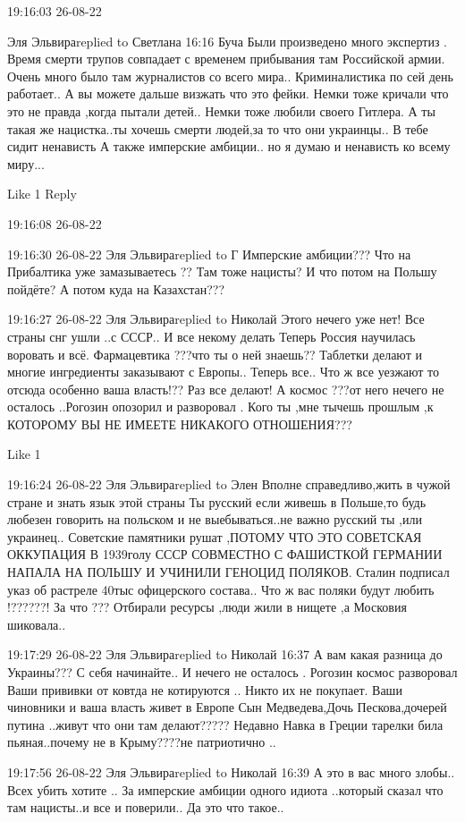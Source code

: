 
 
 
 
 

19:16:03 26-08-22

Эля Эльвираreplied to Светлана
16:16
Буча
Были произведено много экспертиз .
Время смерти трупов совпадает с временем прибывания там Российской армии.
Очень много было там журналистов со всего мира..
Криминалистика по сей день работает..
А вы можете дальше визжать что это фейки.
Немки тоже кричали что это не правда ,когда пытали детей..
Немки тоже любили своего Гитлера.
А ты такая же нацистка..ты хочешь смерти людей,за то что они украинцы..
В тебе сидит ненависть
А также имперские амбиции.. но я думаю и ненависть ко всему миру...

    Like 1
    Reply

19:16:08 26-08-22

19:16:30 26-08-22
Эля Эльвираreplied to Г
Имперские амбиции???
Что на Прибалтика уже замазываетесь ??
Там тоже нацисты?
И что потом на Польшу пойдёте?
А потом куда на Казахстан???

19:16:27 26-08-22
Эля Эльвираreplied to Николай
Этого нечего уже нет!
Все страны снг ушли ..с СССР..
И все некому делать
Теперь Россия научилась воровать и всё.
Фармацевтика ???что ты о ней знаешь??
Таблетки делают и многие ингредиенты заказывают с Европы..
Теперь все..
Что ж все уезжают то отсюда особенно ваша власть!??
Раз все делают!
А космос ???от него нечего не осталось ..Рогозин опозорил и разворовал .
Кого ты ,мне тычешь прошлым ,к КОТОРОМУ ВЫ НЕ ИМЕЕТЕ НИКАКОГО ОТНОШЕНИЯ???

    Like 1

19:16:24 26-08-22
Эля Эльвираreplied to Элен
Вполне справедливо,жить в чужой стране и знать язык этой страны
Ты русский если живешь в Польше,то будь любезен говорить на польском и не выебываться..не важно русский ты ,или украинец..
Советские памятники рушат ,ПОТОМУ ЧТО ЭТО СОВЕТСКАЯ ОККУПАЦИЯ В 1939голу СССР СОВМЕСТНО С ФАШИСТКОЙ ГЕРМАНИИ НАПАЛА НА ПОЛЬШУ И УЧИНИЛИ ГЕНОЦИД ПОЛЯКОВ.
Сталин подписал указ об растреле 40тыс офицерского состава..
Что ж вас поляки будут любить !??????!
За что ???
Отбирали ресурсы ,люди жили в нищете ,а Московия шиковала..

19:17:29 26-08-22
Эля Эльвираreplied to Николай
16:37
А вам какая разница до Украины???
С себя начинайте..
И нечего не осталось .
Рогозин космос разворовал
Ваши прививки от ковтда не котируются ..
Никто их не покупает.
Ваши чиновники и ваша власть живет в Европе
Сын Медведева,Дочь Пескова,дочерей путина ..живут что они там делают?????
Недавно Навка в Греции тарелки била пьяная..почему не в Крыму????не патриотично ..

19:17:56 26-08-22
Эля Эльвираreplied to Николай
16:39
А это в вас много злобы..
Всех убить хотите ..
За имперские амбиции одного идиота ..который сказал что там нацисты..и все и поверили..
Да это что такое..

